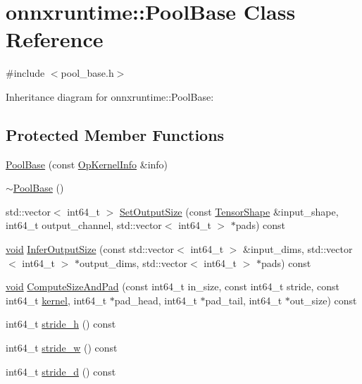 \hypertarget{classonnxruntime_1_1PoolBase}{}\section{onnxruntime\+:\+:Pool\+Base Class Reference}
\label{classonnxruntime_1_1PoolBase}


{\ttfamily \#include $<$pool\+\_\+base.\+h$>$}



Inheritance diagram for onnxruntime\+:\+:Pool\+Base\+:
\subsection*{Protected Member Functions}
\begin{DoxyCompactItemize}
\item 
\mbox{\hyperlink{classonnxruntime_1_1PoolBase_a5af935e3b9738fdb207395c9dae84c21}{Pool\+Base}} (const \mbox{\hyperlink{classonnxruntime_1_1OpKernelInfo}{Op\+Kernel\+Info}} \&info)
\item 
\mbox{\hyperlink{classonnxruntime_1_1PoolBase_a170ff68bb0fefc4f2bf365a35a7691d3}{$\sim$\+Pool\+Base}} ()
\item 
std\+::vector$<$ int64\+\_\+t $>$ \mbox{\hyperlink{classonnxruntime_1_1PoolBase_aa29f1684c5e53beece327006e1e8f9e7}{Set\+Output\+Size}} (const \mbox{\hyperlink{classonnxruntime_1_1TensorShape}{Tensor\+Shape}} \&input\+\_\+shape, int64\+\_\+t output\+\_\+channel, std\+::vector$<$ int64\+\_\+t $>$ $\ast$pads) const
\item 
\mbox{\hyperlink{mlasi_8h_a88f941d423cb2a819b70a1358982b1a6}{void}} \mbox{\hyperlink{classonnxruntime_1_1PoolBase_ab49048558a89a492f93cc36f5e7ab599}{Infer\+Output\+Size}} (const std\+::vector$<$ int64\+\_\+t $>$ \&input\+\_\+dims, std\+::vector$<$ int64\+\_\+t $>$ $\ast$output\+\_\+dims, std\+::vector$<$ int64\+\_\+t $>$ $\ast$pads) const
\item 
\mbox{\hyperlink{mlasi_8h_a88f941d423cb2a819b70a1358982b1a6}{void}} \mbox{\hyperlink{classonnxruntime_1_1PoolBase_ab9c9f378646859e71ecd332088797b6a}{Compute\+Size\+And\+Pad}} (const int64\+\_\+t in\+\_\+size, const int64\+\_\+t stride, const int64\+\_\+t \mbox{\hyperlink{mkldnn_2nn_2pool_8cc_a1fd14bdce0b9db48a6bf8c6ce1320490}{kernel}}, int64\+\_\+t $\ast$pad\+\_\+head, int64\+\_\+t $\ast$pad\+\_\+tail, int64\+\_\+t $\ast$out\+\_\+size) const
\item 
int64\+\_\+t \mbox{\hyperlink{classonnxruntime_1_1PoolBase_a452467aa88e8573f8a4e26818891a200}{stride\+\_\+h}} () const
\item 
int64\+\_\+t \mbox{\hyperlink{classonnxruntime_1_1PoolBase_afd7e12a7ee1236f261419666a272c3c7}{stride\+\_\+w}} () const
\item 
int64\+\_\+t \mbox{\hyperlink{classonnxruntime_1_1PoolBase_a8d8411f6d6befd71f4ce0ae6a7bbfca0}{stride\+\_\+d}} () const
\end{DoxyCompactItemize}
